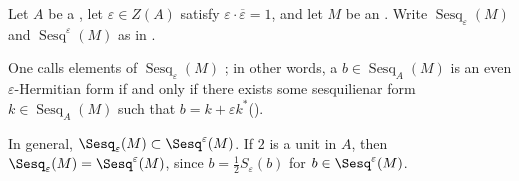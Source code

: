 \begin{definition} \label{definition:even_varepsilon_hermitian_form_on_a_module_over_a_ring_with_involution}
    Let $A$ be a , let $\varepsilon \in Z(A)$ satisfy $\varepsilon \cdot \overline{\varepsilon} = 1$, and let $M$ be an . Write $\operatorname{Sesq}_\varepsilon(M)$ and $\operatorname{Sesq}^\varepsilon(M)$ as in .

    One calls elements of $\operatorname{Sesq}_\varepsilon(M)$ ; in other words, a  $b \in \operatorname{Sesq}_{A}(M)$ is an even $\varepsilon$-Hermitian form if and only if there exists some sesquilienar form $k \in \operatorname{Sesq}_A(M)$ such that $b = k + \varepsilon k^*$(). 

    In general, $\Sesq_\varepsilon(M) \subset \Sesq^\varepsilon(M)$. If $2$ is a unit in $A$, then $\Sesq_\varepsilon(M) = \Sesq^\varepsilon(M)$, since $b = \frac{1}{2} S_{\varepsilon}(b)$ for $b \in \Sesq^\varepsilon(M)$. 
\end{definition}
